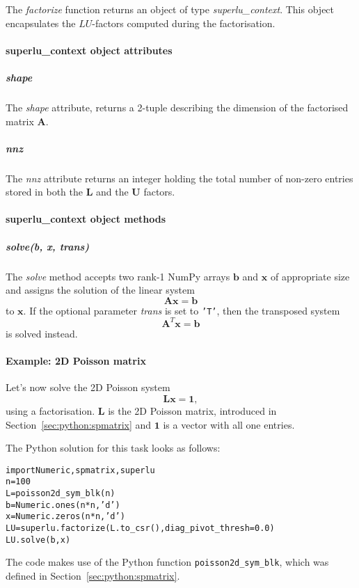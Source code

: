 \documentclass[a4paper]{article}
\newcommand{\mat}[1]{\ensuremath{\boldsymbol{#1}}}
\newcommand{\vect}[1]{\ensuremath{\mathbf{#1}}}
\newlength{\pyindent} \newlength{\pyminipagewidth}
\newenvironment{pycode}{\begin{trivlist}\item\hspace*{\pyindent}\begin{minipage}{\pyminipagewidth}\small\begin{alltt}}
      {\end{alltt}\end{minipage}\end{trivlist}}
\begin{document}
The \textit{factorize} function returns an object of type
\textit{superlu\_context}. This object encapsulates the $LU$-factors
computed during the factorisation.

\paragraph{superlu\_context object attributes}
%
\subparagraph{shape} 
%
The \textit{shape} attribute, returns a 2-tuple describing the
dimension of the factorised matrix $\mat{A}$.

\subparagraph{nnz}
%
The \textit{nnz} attribute returns an integer holding the total number
of non-zero entries stored in both the $\mat{L}$ and the $\mat{U}$
factors.

\paragraph{superlu\_context object methods}
%
\subparagraph{solve(b, x, trans)}
%
The \textit{solve} method accepts two rank-1 NumPy arrays $\vect{b}$
and $\vect{x}$ of appropriate size and assigns the solution of the
linear system
\begin{equation*}
  \mat{A}\vect{x} = \vect{b}
\end{equation*}
to $\vect{x}$. If the optional parameter \textit{trans} is set to
\texttt{'T'}, then the transposed system
\begin{equation*}
  \mat{A}^T\vect{x} = \vect{b}
\end{equation*}
is solved instead.

\paragraph{Example: 2D Poisson matrix}
%
Let's now solve the 2D Poisson system
\begin{equation*}
  \mat{L} \vect{x} = \vect{1},
\end{equation*}
using a factorisation. $\mat{L}$ is the 2D Poisson matrix, introduced
in Section~\ref{sec:python:spmatrix} and $\vect{1}$ is a vector with
all one entries.

\noindent The Python solution for this task looks as follows:
\begin{pycode}
import Numeric, spmatrix, superlu
n = 100
L = poisson2d_sym_blk(n)
b = Numeric.ones(n*n, 'd')
x = Numeric.zeros(n*n, 'd')
LU = superlu.factorize(L.to_csr(), diag_pivot_thresh=0.0)
LU.solve(b, x)
\end{pycode}
The code makes use of the Python function
\texttt{poisson2d\_sym\_blk}, which was defined in
Section~\ref{sec:python:spmatrix}.

\appendix

\end{document}
